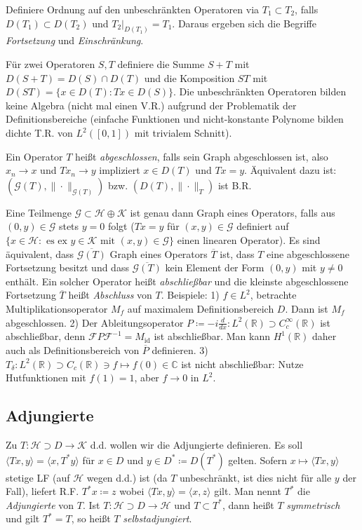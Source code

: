 \documentclass[11pt,a4paper]{scrartcl}
\newcommand{\R}{\mathbb{R}} %
\newcommand{\C}{\mathbb{C}} %
\newcommand{\Hc}{\mathcal{H}}
\newcommand{\Kc}{\mathcal{K}}
\newcommand{\G}{\mathcal{G}}
\newcommand{\F}{\mathcal{F}}
\theoremstyle{plain}
\theoremstyle{definition}
\theoremstyle{remark}
\DeclareMathOperator{\id}{id}
\begin{document}
Definiere Ordnung auf den unbeschränkten Operatoren via $T_1 \subset T_2$, falls $D(T_1)\subset D(T_2)$ und $T_2|_{D(T_1)} = T_1$. Daraus ergeben sich die Begriffe \emph{Fortsetzung} und \emph{Einschränkung}.

Für zwei Operatoren $S,T$ definiere die Summe $S+T$ mit $D(S+T)=D(S)\cap D(T)$ und die Komposition $ST$ mit $D(ST)=\{x\in D(T): Tx\in D(S)\}$. Die unbeschränkten Operatoren bilden keine Algebra (nicht mal einen V.R.) aufgrund der Problematik der Definitionsbereiche (einfache Funktionen und nicht-konstante Polynome bilden dichte T.R. von $L^2([0,1])$ mit trivialem Schnitt).

Ein Operator $T$ heißt \emph{abgeschlossen}, falls sein Graph abgeschlossen ist, also $x_n\to x$ und $Tx_n\to y$ impliziert $x\in D(T)$ und $Tx=y$. Äquivalent dazu ist: $(\G(T),\|\cdot\|_{\G(T)})$ bzw. $(D(T), \|\cdot\|_T)$ ist B.R.

Eine Teilmenge $\G \subset \Hc \oplus \Kc$ ist genau dann Graph eines Operators, falls aus $(0,y)\in \G$ stets $y=0$ folgt ($Tx=y$ für $(x,y)\in \G$ definiert auf $\{x\in \Hc: \text{ es ex } y\in \Kc \text{ mit } (x,y)\in \G\}$ einen linearen Operator). Es sind äquivalent, dass $\overline{\G(T)}$ Graph eines Operators $\overline{T}$ ist, dass $T$ eine abgeschlossene Fortsetzung besitzt und dass $\overline{\G(T)}$ kein Element der Form $(0,y)$ mit $y\neq 0$ enthält. Ein solcher Operator heißt \emph{abschließbar} und die kleinste abgeschlossene Fortsetzung $\overline{T}$ heißt \emph{Abschluss} von $T$. Beispiele: 1) $f\in L^2$, betrachte Multiplikationsoperator $M_f$ auf maximalem Definitionsbereich $D$. Dann ist $M_f$ abgeschlossen. 2) Der Ableitungsoperator $P\coloneqq -i \frac{d}{dx}: L^2(\R) \supset C_c^\infty(\R)$ ist abschließbar, denn $\F P\F^{-1} = M_{\id}$ ist abschließbar. Man kann $H^1(\R)$ daher auch als Definitionsbereich von $\overline{P}$ definieren. 3) $T_\delta: L^2(\R) \supset C_c(\R) \ni f \mapsto f(0) \in \C$ ist nicht abschließbar: Nutze Hutfunktionen mit $f(1)=1$, aber $f\to 0$ in $L^2$.

\subsection{Adjungierte}

Zu $T:\Hc \supset D \to \Kc$ d.d. wollen wir die Adjungierte definieren. Es soll $\langle Tx,y \rangle = \langle x, T^*y \rangle$ für $x\in D$ und $y\in D^*\coloneqq D(T^*)$ gelten. Sofern $x\mapsto \langle Tx, y \rangle$ stetige LF (auf $\Hc$ wegen d.d.) ist (da $T$ unbeschränkt, ist dies nicht für alle $y$ der Fall), liefert R.F. $T^*x\coloneqq z$ wobei $\langle Tx,y \rangle = \langle x, z \rangle$ gilt. Man nennt $T^*$ die \emph{Adjungierte} von $T$. Ist $T: \Hc \supset D \to \Hc$ und $T \subset T^*$, dann heißt $T$ \emph{symmetrisch} und gilt $T^*=T$, so heißt $T$ \emph{selbstadjungiert}. 
\end{document}
